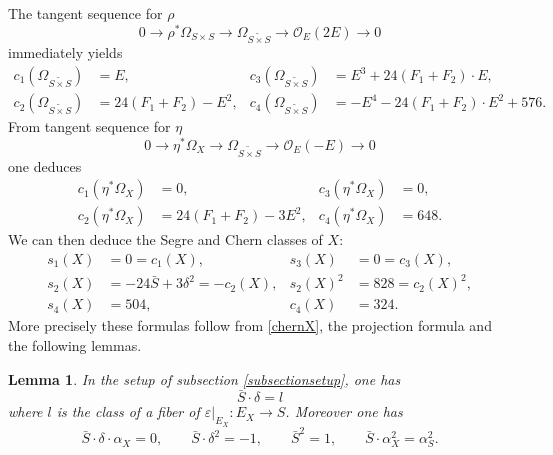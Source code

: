 \documentclass[11pt]{article}
\let\mathcal\mathscr
\theoremstyle{plain}
\newtheorem{lemma}[theorem]{Lemma}
\theoremstyle{definition}
\newcommand\sO{{\mathcal O}}
\newcommand{\blS}{\ensuremath{\widetilde{S \times S}}}
\begin{document}
The tangent sequence for $\rho$
\[
0 \to \rho^* \Omega_{S \times S} \to \Omega_{\blS} \to \sO_E(2E) \to 0
\]
immediately yields
\begin{equation} \label{chernblowup}
\begin{aligned}
c_1(\Omega_{\blS}) &= E, &
c_3(\Omega_{\blS}) &= E^3+ 24 (F_1+F_2) \cdot E,
\\
c_2(\Omega_{\blS}) &= 24 (F_1+F_2) - E^2, &
c_4(\Omega_{\blS}) &= - E^4 - 24 (F_1+F_2) \cdot E^2 + 576.
\end{aligned}
\end{equation}
From tangent sequence for $\eta$
\[
0 \to \eta^* \Omega_X \to \Omega_{\blS} \to \sO_E(-E) \to 0
\]
one deduces
\begin{equation} \label{chernX}
\begin{aligned}
c_1(\eta^* \Omega_X) &= 0, &
c_3(\eta^* \Omega_X) &= 0,
\\
c_2(\eta^* \Omega_X) &= 24 (F_1+F_2) - 3 E^2, &
c_4(\eta^* \Omega_X) &= 648.
\end{aligned}
\end{equation}
We can then deduce the Segre and Chern classes of $X$:
\begin{equation} \label{segreX}
\begin{aligned}
s_1(X) &= 0 = c_1(X),
&
s_3(X)&=0 = c_3(X),
\\
s_2(X) &= -24 \bar S + 3 \delta^2 = -c_2(X),
&
s_2(X)^2&=828=c_2(X)^2,
\\
s_4(X) &= 504,
&
c_4(X) &= 324.
\end{aligned}
\end{equation}
More precisely these formulas follow from \eqref{chernX}, the projection formula and the following lemmas.

\begin{lemma} \label{intersectionsS}
In the setup of subsection \ref{subsectionsetup}, one has
\[
\bar S \cdot \delta = l
\]
where $l$ is the class of a fiber of $\varepsilon|_{E_X}: E_X \to S$. Moreover one has
\[
\bar S \cdot \delta \cdot \alpha_X = 0, \qquad \bar S \cdot \delta^2=-1, \qquad \bar S^2 = 1, \qquad \bar S \cdot \alpha_X^2=\alpha_S^2.
\]
\end{lemma}
\end{document}
